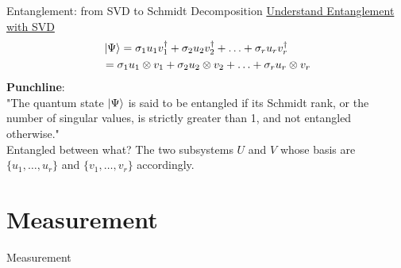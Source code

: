 \documentclass{beamer}
\begin{document}
\begin{frame}{Entanglement: from SVD to Schmidt Decomposition\tiny\cite{understandingentanglementwithsvd}}
  \href{https://www.math3ma.com/blog/understanding-entanglement-with-svd}{Understand Entanglement with SVD}
  \begin{align*}
    &\ket{\Psi} = \sigma_1 u_1 v_1^{\dagger} + \sigma_2 u_2 v_2^{\dagger} + \ldots + \sigma_r u_r v_r^{\dagger} \\
    & = \sigma_1 u_1 \otimes v_1 + \sigma_2 u_2 \otimes v_2 + \ldots + \sigma_r u_r \otimes v_r
  \end{align*}
  \textbf{Punchline}: \\
  "The quantum state $\ket{\Psi}$ is said to be entangled if its Schmidt rank, or
  the number of singular values, is strictly greater than 1, and not entangled
  otherwise." \\
  Entangled between what? The two subsystems $U$ and $V$ whose basis are
  $\{u_1, \ldots, u_r\}$ and $\{v_1, \ldots, v_r\}$ accordingly.
\end{frame}

\section{Measurement}
\begin{frame}
  Measurement
\end{frame}
\end{document}
